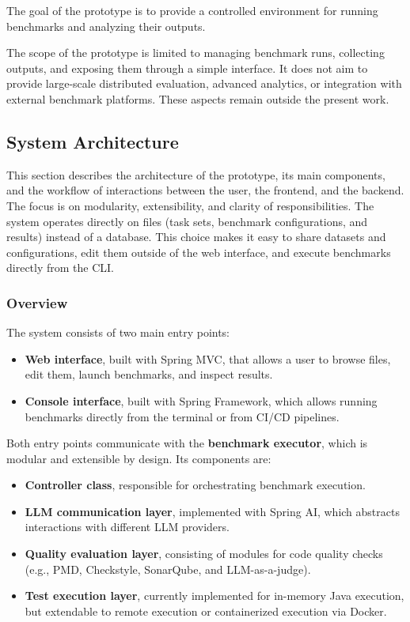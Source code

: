 The goal of the prototype is to provide a controlled environment for running benchmarks and analyzing their outputs.

The scope of the prototype is limited to managing benchmark runs, collecting outputs, and exposing them through a simple interface.
It does not aim to provide large-scale distributed evaluation, advanced analytics, or integration with external benchmark platforms.
These aspects remain outside the present work.

\subsection{System Architecture}

This section describes the architecture of the prototype, its main components, and the workflow of interactions between the user, the frontend, and the backend.
The focus is on modularity, extensibility, and clarity of responsibilities.
The system operates directly on files (task sets, benchmark configurations, and results) instead of a database.
This choice makes it easy to share datasets and configurations, edit them outside of the web interface, and execute benchmarks directly from the CLI.

\subsubsection{Overview}

The system consists of two main entry points:
\begin{itemize}
    \item \textbf{Web interface}, built with Spring MVC, that allows a user to browse files, edit them, launch benchmarks, and inspect results.
    \item \textbf{Console interface}, built with Spring Framework, which allows running benchmarks directly from the terminal or from CI/CD pipelines.
\end{itemize}

Both entry points communicate with the \textbf{benchmark executor}, which is modular and extensible by design.
Its components are:
\begin{itemize}
    \item \textbf{Controller class}, responsible for orchestrating benchmark execution.
    \item \textbf{LLM communication layer}, implemented with Spring AI, which abstracts interactions with different LLM providers.
    \item \textbf{Quality evaluation layer}, consisting of modules for code quality checks (e.g., PMD, Checkstyle, SonarQube, and LLM-as-a-judge).
    \item \textbf{Test execution layer}, currently implemented for in-memory Java execution, but extendable to remote execution or containerized execution via Docker.
\end{itemize}

